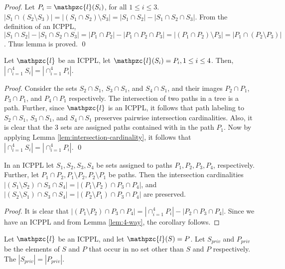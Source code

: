 \documentclass[envcountsect, envcountsame, 11pt]{../lib/llncs2e/llncs}
\def\cl{\mathpzc{l}}
\begin{document}
\begin{proof}%
  Let $P_i = \cl(S_i)$, for all $1 \le i \le  3$.
  $|S_1 \cap (S_2 \setminus S_3)| = |(S_1 \cap S_2) \setminus S_3| =
  |S_1 \cap S_2| - |S_1 \cap S_2 \cap S_3|$. From the definition of an ICPPL, $|S_1 \cap S_2| - |S_1 \cap S_2 \cap S_3| = |P_1
  \cap P_2| - |P_1 \cap P_2 \cap P_3| = |(P_1 \cap P_2) \setminus P_3|
  = |P_1 \cap (P_2 \setminus P_3)|$. Thus lemma is proved. \qed
\end{proof}
\begin{lemma}
\label{lem:4-way}
Let $\cl$ be an ICPPL, let $\cl(S_i)=P_i, 1 \leq i \leq 4$.   Then, $\displaystyle |\cap_{i=1}^4 S_i| =| \cap_{i=1}^4 P_i|$.
\end{lemma}
\begin{proof}
Consider the sets $S_2 \cap S_1$, $S_3 \cap S_1$, and $S_4 \cap S_1$, and their  images $P_2 \cap P_1$, $P_3 \cap P_1$, and $P_4 \cap P_1$ respectively.    The intersection of two paths in a tree is a path. Further, since $\cl$ is an ICPPL, it follows that  path labeling to $S_2 \cap S_1$, $S_3 \cap S_1$, and $S_4 \cap S_1$ preserves pairwise intersection cardinalities.  Also, it is clear that the  3 sets are assigned paths contained with in the path $P_1$.    Now by applying Lemma \ref{lem:intersection-cardinality}, it follows that $\displaystyle |\cap_{i=1}^4 S_i| =| \cap_{i=1}^4 P_i|$. \qed
\end{proof}
\begin{corollary} \label{corr:4-way}
In an ICPPL let $S_1, S_2, S_3, S_4$ be sets assigned to paths $P_1, P_2, P_3, P_4$, respectively.  Further, let $P_1 \cap P_2, P_1 \setminus P_2, P_2 \setminus P_1$ be paths.  Then the intersection cardinalities  $|(S_1 \setminus S_2) \cap S_3 \cap S_4|=|(P_1 \setminus P_2) \cap P_3 \cap P_4|$, and $|(S_2 \setminus S_1) \cap S_3 \cap S_4|= |(P_2 \setminus P_1) \cap P_3 \cap P_4|$
are preserved.
\end{corollary}
\begin{proof}
 It is clear that $|(P_1 \setminus P_2) \cap P_3 \cap P_4| = |\displaystyle \cap_{i=1}^4 P_i| - | P_2 \cap P_3 \cap P_4|$.  Since we have an ICPPL and from Lemma \ref{lem:4-way}, the corollary follows.
\end{proof}
\begin{lemma}
\label{lem:priv-card}
Let $\cl$ be an ICPPL, and let  $\cl(S)=P$.  Let $S_{priv}$ and $P_{priv}$ be the elements of $S$ and $P$ that occur in no  set  other than $S$ and $P$ respectively.
The $|S_{priv}|=|P_{priv}|$.
\end{lemma}
\end{document}
